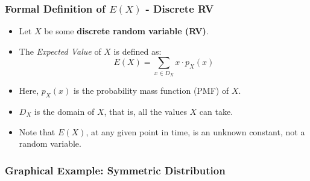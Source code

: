 \documentclass[handout]{beamer} %
\begin{document}
\begin{frame} %
\frametitle{Formal Definition of \(E(X)\) - Discrete RV}

\begin{itemize}
  \item Let $X$ be some \textbf{discrete random variable (RV)}.
  \item The \emph{Expected Value} of $X$ is defined as:
  \pause
  \[
  E(X) = \sum_{x \in D_X} x \cdot p_X(x)
  \]
  \pause
  \item Here, \(p_X(x)\) is the probability mass function (PMF) of \(X\).
  \pause
  \item $D_X$ is the domain of $X$, that is, all the values $X$ can take.
  \pause
  \item Note that $E(X)$, at any given point in time, is an unknown constant, not a random variable.
\end{itemize}

\end{frame}

\begin{frame} %
\frametitle{Graphical Example: Symmetric Distribution}
\vspace{1.5em}

\begin{figure}[ht]
\centering
{}
\end{figure}

\end{frame}
\end{document}
